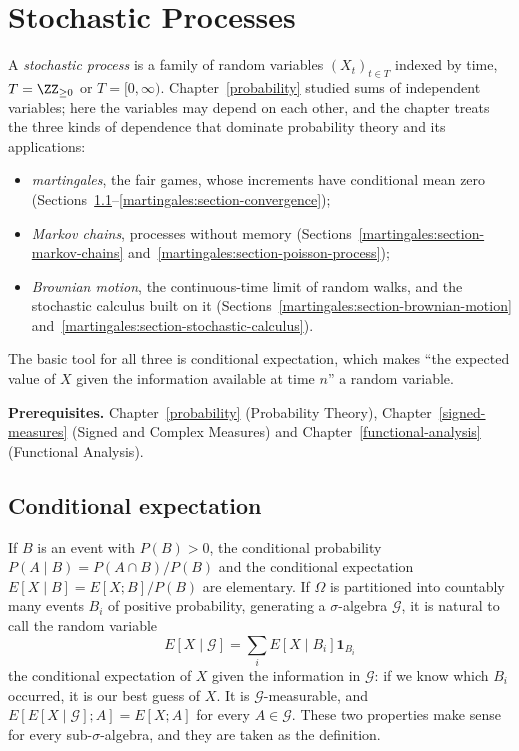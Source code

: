 \chapter{Stochastic Processes}\label{martingales}

A \emph{stochastic process} is a family of random variables $(X_t)_{t \in T}$ indexed by time, $T = \ZZ_{\geq 0}$ or $T = [0, \infty)$. Chapter~\ref{probability} studied sums of independent variables; here the
variables may depend on each other, and the chapter treats the three kinds of dependence that dominate probability theory and its applications:
\begin{itemize}
\item \emph{martingales}, the fair games, whose increments have conditional mean zero (Sections~\ref{martingales:section-conditional-expectation}--\ref{martingales:section-convergence});
\item \emph{Markov chains}, processes without memory (Sections~\ref{martingales:section-markov-chains} and~\ref{martingales:section-poisson-process});
\item \emph{Brownian motion}, the continuous-time limit of random walks, and the stochastic calculus built on it (Sections~\ref{martingales:section-brownian-motion} and~\ref{martingales:section-stochastic-calculus}).
\end{itemize}
The basic tool for all three is conditional expectation, which makes ``the expected value of $X$ given the information available at time $n$'' a random variable.

\noindent\textbf{Prerequisites.} Chapter~\ref{probability} (Probability Theory), Chapter~\ref{signed-measures} (Signed and Complex Measures) and Chapter~\ref{functional-analysis} (Functional Analysis).

\section{Conditional expectation}\label{martingales:section-conditional-expectation}

If $B$ is an event with $P(B) > 0$, the conditional probability $P(A \mid B) = P(A \cap B)/P(B)$ and the conditional expectation $E[X \mid B] = E[X; B]/P(B)$ are elementary. If $\Omega$ is partitioned into countably many
events $B_i$ of positive probability, generating a $\sigma$-algebra $\mathcal{G}$, it is natural to call the random variable
\[
E[X \mid \mathcal{G}] = \sum_iE[X \mid B_i]\mathbf{1}_{B_i}
\]
the conditional expectation of $X$ given the information in $\mathcal{G}$: if we know which $B_i$ occurred, it is our best guess of $X$. It is $\mathcal{G}$-measurable, and $E[E[X \mid \mathcal{G}]; A] = E[X; A]$ for every
$A \in \mathcal{G}$. These two properties make sense for every sub-$\sigma$-algebra, and they are taken as the definition.

